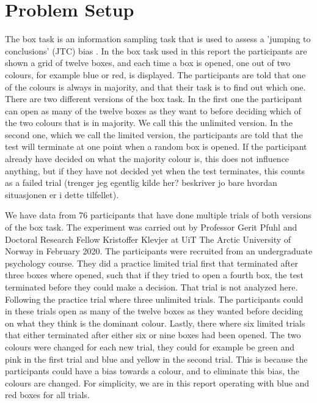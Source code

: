 \newpage
\chapter{Problem Setup}
The box task is an information sampling task that is used to assess a 'jumping to conclusions' (JTC) bias \citep{balzan2017}. In the box task used in this report the participants are shown a grid of twelve boxes, and each time a box is opened, one out of two colours, for example blue or red, is displayed. The participants are told that one of the colours is always in majority, and that their task is to find out which one. There are two different versions of the box task. In the first one the participant can open as many of the twelve boxes as they want to before deciding which of the two colours that is in majority. We call this the unlimited version. In the second one, which we call the limited version, the participants are told that the test will terminate at one point when a random box is opened. If the participant already have decided on what the majority colour is, this does not influence anything, but if they have not decided yet when the test terminates, this counts as a failed trial \citep{moritz2017} (trenger jeg egentlig kilde her? beskriver jo bare hvordan situasjonen er i dette tilfellet). 

We have data from 76 participants that have done multiple trials of both versions of the box task. The experiment was   carried out by Professor Gerit Pfuhl and Doctoral Research Fellow Kristoffer Klevjer at UiT The Arctic University of Norway in February 2020. The participants were recruited from an undergraduate psychology course. They did a practice limited trial first that terminated after three boxes where opened, such that if they tried to open a fourth box, the test terminated before they could make a decision. That trial is not analyzed here. Following the practice trial where three unlimited trials. The participants could in these trials open as many of the twelve boxes as they wanted before deciding on what they think is the dominant colour. Lastly, there where six limited trials that either terminated after either six or nine boxes had been opened. The two colours were changed for each new trial, they could for example be green and pink in the first trial and blue and yellow in the second trial. This is because the participants could have a bias towards a colour, and to eliminate this bias, the colours are changed. For simplicity, we are in this report operating with blue and red boxes for all trials. 


